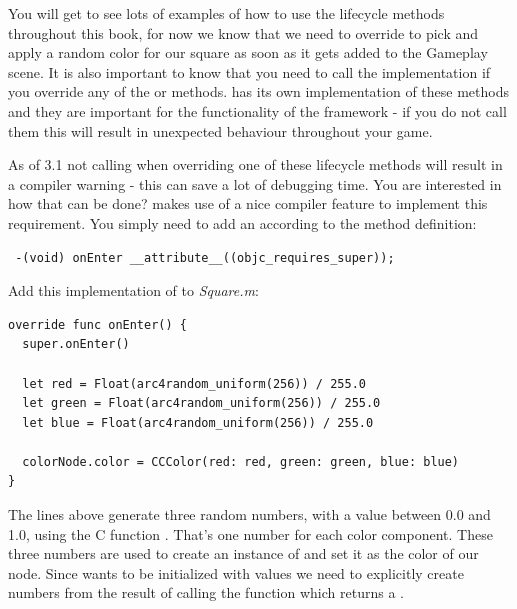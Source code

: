 You will get to see lots of examples of how to use the lifecycle methods
throughout this book, for now we know that we need to override
 to pick and apply a random color for our square as soon as
it gets added to the Gameplay scene. It is also important to know that you need
to call the  implementation if you override any of the 
 or  methods. \ccnode{}
has its own implementation of these methods and they are important for the
functionality of the framework - if you do not call them this will result in
unexpected behaviour throughout your game. 
\begin{details}
As of \cocos{} 3.1 not calling  when overriding one of these
lifecycle methods will result in a compiler warning - this can save a lot of
debugging time. You are interested in how that can be done? \cocos{} makes use
of a nice compiler feature to implement this requirement. You simply need to
add an according  to the method definition:

\begin{lstlisting}
 -(void) onEnter __attribute__((objc_requires_super));
\end{lstlisting}

\end{details}
\begin{leftbar}
Add this implementation of
 to \textit{Square.m}:
\begin{lstlisting}
override func onEnter() {
  super.onEnter()
  
  let red = Float(arc4random_uniform(256)) / 255.0
  let green = Float(arc4random_uniform(256)) / 255.0
  let blue = Float(arc4random_uniform(256)) / 255.0
  
  colorNode.color = CCColor(red: red, green: green, blue: blue)
}
\end{lstlisting}
\end{leftbar}
The lines above generate three random numbers, with a value between 0.0 and 1.0,
using the C function . That's one number for
each color component. These three numbers are used to create an
instance of  and set it as the color of our node. Since  wants to be initialized with  values we
need to explicitly create  numbers from the result of calling
the  function which returns a
.

